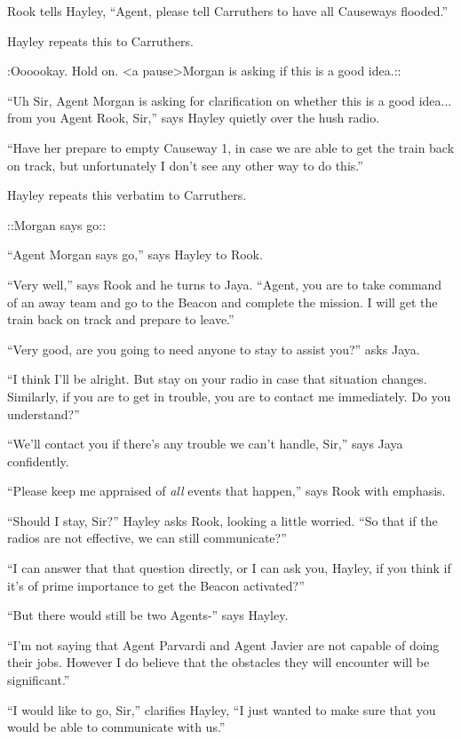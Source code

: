 Rook tells Hayley, ``Agent, please tell Carruthers to have all Causeways flooded.''

Hayley repeats this to Carruthers.

 {\color[RGB]{153,0,255}:Oooookay.  Hold on.  \textless a pause\textgreater   Morgan is asking if this is a good idea.::} 

``Uh Sir, Agent Morgan is asking for clarification on whether this is a good idea... from you Agent Rook, Sir,'' says Hayley quietly over the hush radio.

``Have her prepare to empty Causeway 1, in case we are able to get the train back on track, but unfortunately I don't see any other way to do this.''

Hayley repeats this verbatim to Carruthers.

 {\color[RGB]{153,0,255}::Morgan says go::} 

``Agent Morgan says go,'' says Hayley to Rook. 

``Very well,'' says Rook and he turns to Jaya.  ``Agent, you are to take command of an away team and go to the Beacon and complete the mission.  I will get the train back on track and prepare to leave.''

``Very good, are you going to need anyone to stay to assist you?'' asks Jaya.

``I think I'll be alright.  But stay on your radio in case that situation changes.  Similarly, if you are to get in trouble, you are to contact me immediately. Do you understand?''

``We'll contact you if there's any trouble we can't handle, Sir,'' says Jaya confidently.

``Please keep me appraised of \textit{all }events that happen,'' says Rook with emphasis.

``Should I stay, Sir?'' Hayley asks Rook, looking a little worried.  ``So that if the radios are not effective, we can still communicate?''

``I can answer that that question directly, or I can ask you, Hayley, if you think if it's of prime importance to get the Beacon activated?''

``But there would still be two Agents-'' says Hayley.

``I'm not saying that Agent Parvardi and Agent Javier are not capable of doing their jobs.  However I do believe that the obstacles they will encounter will be significant.''

``I would like to go, Sir,'' clarifies Hayley, ``I just wanted to make sure that you would be able to communicate with us.''

